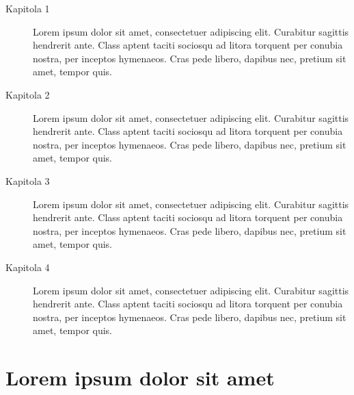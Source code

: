 \begin{description}
  \item[Kapitola 1] Lorem ipsum dolor sit amet, consectetuer adipiscing elit. Curabitur sagittis hendrerit ante. Class aptent taciti sociosqu ad litora torquent per conubia nostra, per inceptos hymenaeos. Cras pede libero, dapibus nec, pretium sit amet, tempor quis.

  \item[Kapitola 2] Lorem ipsum dolor sit amet, consectetuer adipiscing elit. Curabitur sagittis hendrerit ante. Class aptent taciti sociosqu ad litora torquent per conubia nostra, per inceptos hymenaeos. Cras pede libero, dapibus nec, pretium sit amet, tempor quis.

  \item[Kapitola 3] Lorem ipsum dolor sit amet, consectetuer adipiscing elit. Curabitur sagittis hendrerit ante. Class aptent taciti sociosqu ad litora torquent per conubia nostra, per inceptos hymenaeos. Cras pede libero, dapibus nec, pretium sit amet, tempor quis.

  \item[Kapitola 4] Lorem ipsum dolor sit amet, consectetuer adipiscing elit. Curabitur sagittis hendrerit ante. Class aptent taciti sociosqu ad litora torquent per conubia nostra, per inceptos hymenaeos. Cras pede libero, dapibus nec, pretium sit amet, tempor quis.
\end{description}

\section{Lorem ipsum dolor sit amet}
